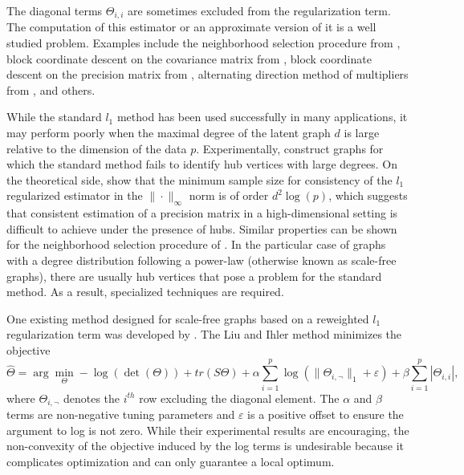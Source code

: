 \documentclass{uwstat572}
\theoremstyle{remark}
\theoremstyle{definition}
\begin{document}
The diagonal terms $\Theta_{i,i}$ are sometimes excluded from the regularization term. The computation of this estimator or an approximate version of it is a well studied problem.  Examples include the neighborhood selection procedure from \cite{meinshausen2006}, block coordinate descent on the covariance matrix from \cite{Banerjee2008}, block coordinate descent on the precision matrix from \cite{Friedman2008}, alternating direction method of multipliers from \cite{Boyd2011}, and others.

While the standard $l_1$ method has been used successfully in many applications, it may perform poorly when the maximal degree of the latent graph $d$ is large relative to the dimension of the data $p$. Experimentally, \cite{Schaefer2005} construct graphs for which the standard method fails to identify hub vertices with large degrees. 
On the theoretical side, \cite{ravikumar2011} show that the minimum sample size for consistency of the $l_1$ regularized estimator in the $\| \cdot \|_{\infty}$ norm is of order $d^2 \log(p)$, which suggests that consistent estimation of a precision matrix in a high-dimensional setting is difficult to achieve under the presence of hubs. 
Similar properties can be shown for the neighborhood selection procedure of \cite{meinshausen2006}.  In the particular case of graphs with a degree distribution following a power-law (otherwise known as scale-free graphs), there are usually hub vertices that pose a problem for the standard method.  As a result, specialized techniques are required.

One existing method designed for scale-free graphs based on a reweighted $l_1$ regularization term was developed by \cite{liu11c}.  The Liu and Ihler method minimizes the objective
\begin{equation*}
    \widehat{\Theta} = \arg\min_{\Theta}  -\log( \det( \Theta)) + tr(S \Theta) + \alpha \sum_{i=1}^p \log( \| \Theta_{i,\neg}\|_1 + \varepsilon ) + \beta \sum_{i=1}^p |\Theta_{i,i}|,
\end{equation*}
where $\Theta_{i,\neg}$ denotes the $i^{th}$ row excluding the diagonal element.  The $\alpha$ and $\beta$ terms are non-negative tuning parameters and $\varepsilon$ is a positive offset to ensure the argument to log is not zero. While their experimental results are encouraging, the non-convexity of the objective induced by the log terms is undesirable because it complicates optimization and can only guarantee a local optimum.
\end{document}
